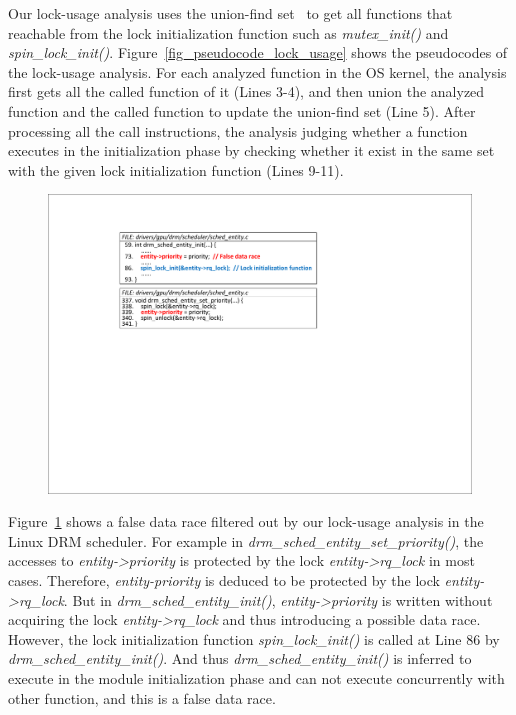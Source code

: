 Our lock-usage analysis uses the union-find set~\cite{Galler:ACM64} to get all 
functions that reachable from the lock initialization function such as {\em 
mutex\_init()} and {\em spin\_lock\_init()}. 
Figure~\ref{fig_pseudocode_lock_usage} shows the pseudocodes of the lock-usage 
analysis. For each analyzed function in the OS kernel, the analysis first gets 
all the called function of it (Lines 3-4), and then union the analyzed function 
and the called function to update the union-find set (Line 5). After processing 
all the call instructions, the analysis judging whether a function executes in 
the initialization phase by checking whether it exist in the same set with the 
given lock initialization function (Lines 9-11).

\begin{figure}[htbp]
	\centering
	\includegraphics[width=0.9\linewidth]{figures/fig_demo_lock_usage.pdf}
	\label{fig_demo_lock_usage}
\end{figure}

 Figure~\ref{fig_demo_lock_usage} shows a false 
data race filtered out by our lock-usage analysis in the Linux DRM scheduler. 
For example in {\em drm\_sched\_entity\_set\_priority()}, the accesses to {\em 
entity->priority} is protected by the lock {\em entity->rq\_lock} in most 
cases. Therefore, {\em entity-priority} is deduced to be protected by the lock 
{\em entity->rq\_lock}. But in {\em drm\_sched\_entity\_init()}, {\em 
entity->priority} is written without acquiring the lock {\em entity->rq\_lock} 
and thus introducing a possible data race. However, the lock initialization 
function {\em spin\_lock\_init()} is called at Line 86 by {\em 
drm\_sched\_entity\_init()}. And thus {\em drm\_sched\_entity\_init()} is 
inferred to execute in the module initialization phase and can not execute 
concurrently with other function, and this is a false data race.

